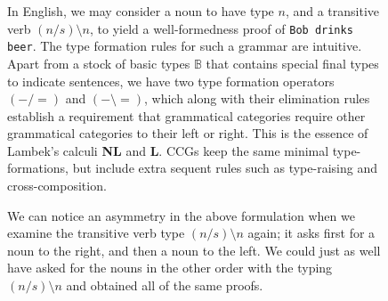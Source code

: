 \begin{figure}[h!]
\centering
{}
\caption{In English, we may consider a noun to have type $n$, and a transitive verb $(n/s)\setminus n$, to yield a well-formedness proof of \texttt{Bob drinks beer}. The type formation rules for such a grammar are intuitive. Apart from a stock of basic types $\mathbb{B}$ that contains special final types to indicate sentences, we have two type formation operators $(-/=)$ and $(- \setminus =)$, which along with their elimination rules establish a requirement that grammatical categories require other grammatical categories to their left or right. This is the essence of Lambek's calculi \textbf{NL} and \textbf{L}. CCGs keep the same minimal type-formations, but include extra sequent rules such as type-raising and cross-composition.}
\end{figure}

\begin{figure}[h!]
\centering
{}
\caption{We can notice an asymmetry in the above formulation when we examine the transitive verb type $(n/s)\setminus n$ again; it asks first for a noun to the right, and then a noun to the left. We could just as well have asked for the nouns in the other order with the typing $(n/s)\setminus n$ and obtained all of the same proofs.}
\end{figure}

